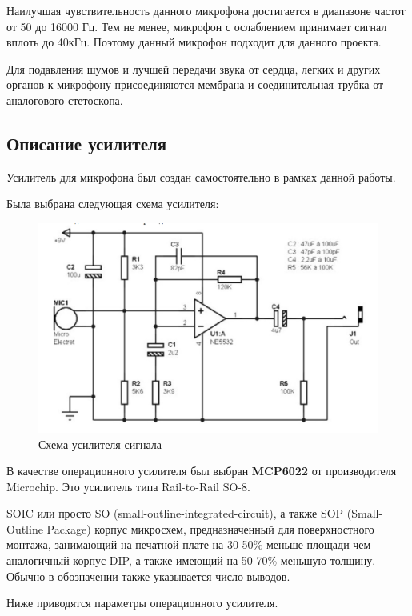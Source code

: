\documentclass[../paper.tex]{subfiles}
\begin{document}
Наилучшая чувствительность данного микрофона достигается в диапазоне частот от 50 до 16000 Гц. Тем не менее, микрофон с ослаблением принимает сигнал вплоть до 40кГц. Поэтому данный микрофон подходит для данного проекта.

Для подавления шумов и лучшей передачи звука от сердца, легких и других органов к микрофону присоединяются мембрана и соединительная трубка от аналогового стетоскопа.

\subsection{Описание усилителя}
Усилитель для микрофона был создан самостоятельно в рамках данной работы.

Была выбрана следующая схема усилителя:

\begin{figure}[H]
\centering
\includegraphics[width=14cm]{images/circuit.jpg}
\caption{Схема усилителя сигнала}
\end{figure}

В качестве операционного усилителя был выбран \textbf{MCP6022} от производителя Microchip. Это усилитель типа Rail-to-Rail SO-8.

SOIC или просто SO (small-outline-integrated-circuit), а также SOP (Small-Outline Package) корпус микросхем, предназначенный для поверхностного монтажа, занимающий на печатной плате на 30-50\% меньше площади чем аналогичный корпус DIP, а также имеющий на 50-70\% меньшую толщину. Обычно в обозначении также указывается число выводов.

Ниже приводятся параметры операционного усилителя.
\end{document}
